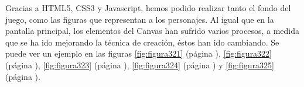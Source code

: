Gracias a HTML5, CSS3 y Javascript, hemos podido realizar tanto el fondo del juego, como las figuras que representan a los personajes.
Al igual que en la pantalla principal, los elementos del Canvas han sufrido varios procesos, a medida que se ha ido mejorando la técnica de creación, éstos han ido cambiando.
Se puede ver un ejemplo en las figuras \ref{fig:figura321} (página \pageref{fig:figura321}), \ref{fig:figura322} (página \pageref{fig:figura322}), 
\ref{fig:figura323} (página \pageref{fig:figura323}), \ref{fig:figura324} (página \pageref{fig:figura324}) y \ref{fig:figura325} (página \pageref{fig:figura325}).
